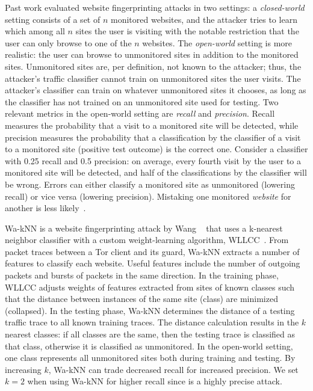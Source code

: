 Past work evaluated website fingerprinting attacks in two settings:
a {\em closed-world} setting consists of a set of $n$ {monitored}
websites, and the attacker tries to learn which among all $n$ sites the
user is visiting with the notable restriction that the user can only
browse to one of the $n$ websites.  The {\em open-world} setting is more
realistic: the user can browse to {unmonitored} sites in addition to the
monitored sites. Unmonitored sites are, per definition, not known to the
attacker; thus, the attacker's traffic classifier cannot train on unmonitored
sites the user visits. The attacker's classifier can train on
whatever unmonitored sites it chooses, as long as the
classifier has not trained on an unmonitored site used for testing.
Two relevant metrics
in the open-world
setting are \emph{recall} and \emph{precision}.
Recall measures the probability that
a visit to a monitored site will be detected, while precision measures
the probability that a classification by the classifier of a visit to a
monitored site (positive test outcome) is the correct one. Consider a
classifier with 0.25 recall and 0.5 precision: on average, every fourth
visit by the user to a monitored site will be detected, and half of the
classifications by the classifier will be wrong. Errors can
either classify a monitored site as
unmonitored (lowering recall) or vice versa (lowering precision).
Mistaking one monitored \emph{website} for another is less
likely~\cite{Wang2015a}.

Wa-kNN is a website fingerprinting attack by Wang \ea~\cite{Wang2014a}
that uses a k-nearest neighbor classifier with a custom weight-learning
algorithm, WLLCC~\cite[\S~3.2.5]{Wang2015a}.  From {packet traces}
between a Tor client and its guard, Wa-kNN extracts a number of {features}
to classify each website.  Useful features include
the number of outgoing packets and bursts of packets in the same direction.
In the training phase, WLLCC adjusts {weights} of features extracted from
sites of known classes such that the {distance} between instances of the
same site (class) are minimized (collapsed).
In the testing phase, Wa-kNN determines the distance of a testing traffic trace
to all known training traces.  The distance calculation results in the $k$
nearest classes: if all classes are the same, then the testing trace is
classified as that class, otherwise it is classified as unmonitored.
In the open-world setting, one class represents all unmonitored sites both
during training and testing.  By increasing $k$, Wa-kNN can trade decreased
recall for increased precision.  We set $k=2$ when using Wa-kNN for higher
recall since \name is a highly precise attack.

